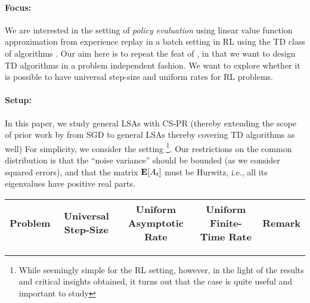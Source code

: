\paragraph{Focus:} We are interested in the setting of \emph{policy evaluation} \cite{dann} using linear value function approximation from experience replay \cite{lin} in a batch setting \cite{lange} in RL using the TD class of algorithms \cite{sutton,konda-tsitsiklis,gtd,gtd2,gtdmp}. Our aim here is to repeat the feat of \cite{bach}, in that we want to design TD algorithms in a problem independent fashion. We want to explore whether it is possible to have universal step-size and uniform rates for RL problems.
\paragraph{Setup:}  In this paper, we study general LSAs with CS-PR (thereby extending the scope of prior work by \citet{bach} from SGD to general LSAs thereby covering TD algorithms as well)  For simplicity, we consider the \iid setting \footnote{While seemingly simple for the RL setting, however, in the light of the results and critical insights obtained, it turns out that the \iid case is quite useful and important to study}.  Our restrictions on the common  distribution is that the ``noise variance'' should be bounded (as we consider squared errors), and that the matrix $\mathbf{E}[A_t]$ must be Hurwitz, i.e., all its eigenvalues have positive real parts. %
\begin{table*}
\begin{tabular}{|c|c|c|c|c}\hline
Problem& Universal Step-Size& Uniform Asymptotic Rate& Uniform Finite-Time Rate& Remark \\\hline
\end{tabular}
\end{table*}
